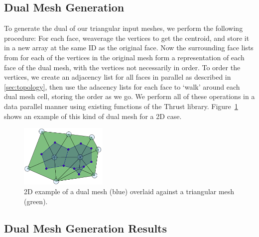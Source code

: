 \documentclass[10pt,journal,cspaper,compsoc]{IEEEtran}
\begin{document}
\subsection{Dual Mesh Generation}
To generate the dual of our triangular input meshes, we perform the following procedure: For each face, weaverage the vertices to get the centroid, and store it in a new array at the same ID as the original face. Now the surrounding face lists from  for each of the vertices in the original mesh form a representation of each face of the dual mesh, with the vertices not necessarily in order. To order the vertices, we create an adjacency list for all faces in parallel as described in \ref{sec:topology}, then use the adacency lists for each face to `walk' around each dual mesh cell, storing the order as we go. We perform all of these operations in a data parallel manner using existing functions of the Thrust library. Figure~\ref{fig:DualExample} shows an example of this kind of dual mesh for a 2D case.

\begin{figure}[!tb]
\begin{center}
\includegraphics[height=3cm]{DualExample.pdf}
\end{center}
\caption{2D example of a dual mesh (blue) overlaid against a triangular mesh (green).}
\label{fig:DualExample}
\end{figure}

\subsection{Dual Mesh Generation Results}
\end{document}
